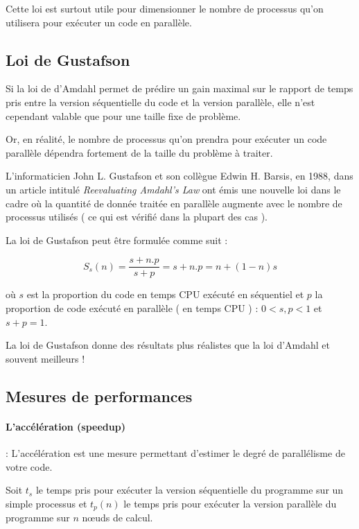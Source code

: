 \documentclass[fleqn,11pt]{article}
\begin{document}
Cette loi est surtout utile pour dimensionner le nombre de processus qu'on utilisera pour exécuter un code en parallèle.

\subsection{Loi de Gustafson}

Si la loi de d'Amdahl permet de prédire un gain maximal sur le rapport de temps pris entre la version séquentielle du code
et la version parallèle, elle n'est cependant valable que pour une taille fixe de problème.

Or, en réalité, le nombre de processus qu'on prendra pour exécuter un code parallèle dépendra fortement de la taille du problème
à traiter. 

L'informaticien John L. Gustafson et son collègue Edwin H. Barsis, en 1988, dans un article intitulé \textsl{Reevaluating Amdahl's Law}
ont émis une nouvelle loi dans le cadre où la quantité de donnée traitée en parallèle augmente avec le nombre de processus utilisés ( ce qui est vérifié
dans la plupart des cas ).

La loi de Gustafson peut être formulée comme suit :

\begin{equation}
 S_{s}(n) = \frac{s+n.p}{s+p} = s + n.p = n + (1-n)s
\end{equation}

où $s$ est la proportion du code en temps CPU exécuté en séquentiel et $p$ la proportion de code exécuté en parallèle ( en temps CPU ) :
$0 < s,p < 1$ et $s+p=1$.

La loi de Gustafson donne des résultats plus réalistes que la loi d'Amdahl et souvent meilleurs !

\subsection{Mesures de performances}

\paragraph{L'accélération (speedup)} : L'accélération est une mesure permettant d'estimer le degré de 
parallélisme de votre code.

Soit $t_{s}$ le temps pris pour exécuter la version séquentielle du programme sur un simple processus
et $t_{p}(n)$ le temps pris pour exécuter la version parallèle du programme sur $n$ n{\oe}uds de calcul.
\end{document}
